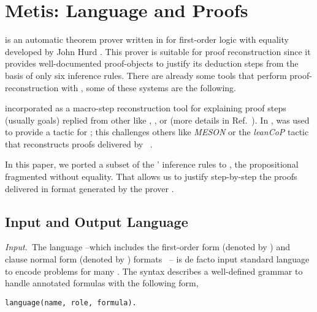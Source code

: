 \documentclass[../main.tex]{subfiles}
\begin{document}

\section{Metis: Language and Proofs}
\label{sec:metis-language-and-proofs}

\Metis is an automatic theorem prover written in 
for first-order logic with equality developed by John Hurd
\cite{hurd2003first}. This prover is suitable for proof
reconstruction since it provides well-documented proof-objects to
justify its deduction steps from the basis of only six inference
rules. There are already some tools that perform proof-reconstruction
with \Metis, some of these systems are the following.

 incorporated \Metis as a macro-step
reconstruction tool for explaining proof steps (usually \CNF goals)
replied from other \ATPs like , , or
 (more details in Ref.~\cite{paulson2007source}).
In \cite{Farber2015}, \Metis was used to provide a tactic for
; this challenges others like \emph{MESON}
or the \emph{leanCoP} tactic that reconstructs proofs
delivered by ~\cite{Farber2016}.

In this paper, we ported a subset of the \Metis' inference rules to
\Agda, the propositional fragmented without equality.
That allows us to justify step-by-step the proofs delivered in
\TSTP format generated by the prover \Metis.


\subsection{Input and Output Language}
\label{ssec:input-and-output-language}

\textit{Input.}~The \TPTP language --which includes the first-order
form (denoted by ) and clause normal form (denoted by
) formats~\cite{sutcliffe2009} -- is de facto input
standard language to encode problems for many \ATPs. The \TPTP
syntax describes a well-defined grammar to handle annotated formulas
with the following form,

\begin{verbatim}
language(name, role, formula).
\end{verbatim}
\end{document}
